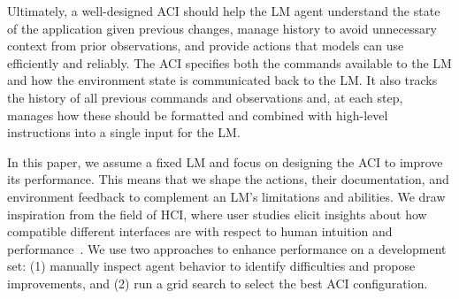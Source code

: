 Ultimately, a well-designed ACI should help the LM agent understand the state of the application given previous changes, manage history to avoid unnecessary context from prior observations, and provide actions that models can use efficiently and reliably.
The ACI specifies both the commands available to the LM and how the environment state is communicated back to the LM.
It also tracks the history of all previous commands and observations and, at each step, manages how these should be formatted and combined with high-level instructions into a single input for the LM.

In this paper, we assume a fixed LM and focus on designing the ACI to improve its performance. 
This means that we shape the actions, their documentation, and environment feedback to complement an LM's limitations and abilities.
We draw inspiration from the field of HCI, where user studies elicit insights about how compatible different interfaces are with respect to human intuition and performance~\citep{cooperaboutface}.
We use two approaches to enhance performance on a development set: (1) manually inspect agent behavior to identify difficulties and propose improvements, and (2) run a grid search to select the best ACI configuration.

